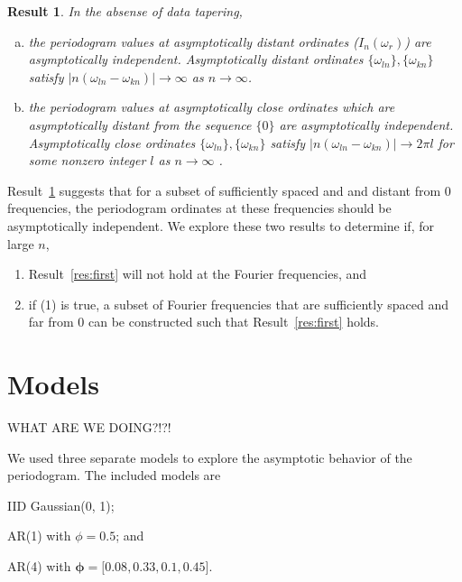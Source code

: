 \documentclass{article}\usepackage[]{graphicx}\usepackage[]{color}
\newcommand{\mj}[1]{{\color{blue} #1}}
\theoremstyle{plain}
\newtheorem{res}{Result}
\begin{document}
\begin{res} \label{res:lahiri}
In the absense of data tapering,
\begin{enumerate}[(a)]
\item the periodogram values at asymptotically distant ordinates ($I_n(\omega_r)$) are asymptotically independent.  Asymptotically distant ordinates $\{\omega_{ln}\}, \{\omega_{kn}\}$ satisfy $|n(\omega_{ln} - \omega_{kn})| \rightarrow \infty$ as $n \rightarrow \infty$.

\item the periodogram values at asymptotically close ordinates which are asymptotically distant from the sequence $\{0\}$ are asymptotically independent. Asymptotically close ordinates $\{\omega_{ln}\}, \{\omega_{kn}\}$ satisfy $|n(\omega_{ln} - \omega_{kn})| \rightarrow 2\pi l$ for some nonzero integer $l$ as $n \rightarrow \infty$ \cite{lahiri2003necessary}.
\end{enumerate}
\end{res}


Result~\ref{res:lahiri} suggests that for a subset of sufficiently spaced and and distant from 0 frequencies, the periodogram ordinates at these frequencies should be asymptotically independent. \mj{We explore these two results to determine if}, for large $n$,
\begin{enumerate}
  \item Result~\ref{res:first} will not hold at the Fourier frequencies, and
  \item if (1) is true, a subset of Fourier frequencies that are sufficiently spaced and far from 0 can be constructed such that Result~\ref{res:first} holds.
\end{enumerate}




\section{Models}

\mj{WHAT ARE WE DOING?!?!}

We used three separate models to explore the asymptotic behavior of the periodogram. The included models are \begin{inparaenum}
\item IID Gaussian(0, 1);
\item AR(1) with $\phi = 0.5$; and
\item AR(4) with $\boldsymbol{\phi} = [0.08, 0.33, 0.1, 0.45$].
\end{inparaenum}
\end{document}
